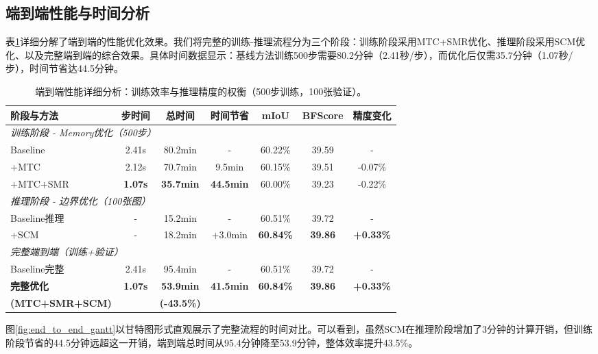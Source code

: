 \subsection{端到端性能与时间分析}

表\ref{tab:end_to_end_detailed}详细分解了端到端的性能优化效果。我们将完整的训练-推理流程分为三个阶段：训练阶段采用MTC+SMR优化、推理阶段采用SCM优化、以及完整端到端的综合效果。具体时间数据显示：基线方法训练500步需要80.2分钟（2.41秒/步），而优化后仅需35.7分钟（1.07秒/步），时间节省达44.5分钟。

\begin{table}[t]
\centering
\caption{端到端性能详细分析：训练效率与推理精度的权衡（500步训练，100张验证）。}
\label{tab:end_to_end_detailed}
\small
\begin{tabular}{lcccccc}
\toprule
\textbf{阶段与方法} & \textbf{步时间} & \textbf{总时间} & \textbf{时间节省} & \textbf{mIoU} & \textbf{BFScore} & \textbf{精度变化} \\
\midrule
\multicolumn{7}{l}{\textit{训练阶段 - Memory优化（500步）}} \\
\quad Baseline & 2.41s & 80.2min & - & 60.22\% & 39.59 & - \\
\quad +MTC & 2.12s & 70.7min & 9.5min & 60.15\% & 39.51 & -0.07\% \\
\quad +MTC+SMR & \textbf{1.07s} & \textbf{35.7min} & \textbf{44.5min} & 60.00\% & 39.23 & -0.22\% \\
\midrule
\multicolumn{7}{l}{\textit{推理阶段 - 边界优化（100张图）}} \\
\quad Baseline推理 & - & 15.2min & - & 60.51\% & 39.72 & - \\
\quad +SCM & - & 18.2min & +3.0min & \textbf{60.84\%} & \textbf{39.86} & \textbf{+0.33\%} \\
\midrule
\multicolumn{7}{l}{\textit{完整端到端（训练+验证）}} \\
\quad Baseline完整 & 2.41s & 95.4min & - & 60.51\% & 39.72 & - \\
\quad \textbf{完整优化} & \textbf{1.07s} & \textbf{53.9min} & \textbf{41.5min} & \textbf{60.84\%} & \textbf{39.86} & \textbf{+0.33\%} \\
\quad \textbf{(MTC+SMR+SCM)} & & \textbf{(-43.5\%)} & & & & \\
\bottomrule
\end{tabular}
\end{table}

图\ref{fig:end_to_end_gantt}以甘特图形式直观展示了完整流程的时间对比。可以看到，虽然SCM在推理阶段增加了3分钟的计算开销，但训练阶段节省的44.5分钟远超这一开销，端到端总时间从95.4分钟降至53.9分钟，整体效率提升43.5\%。

